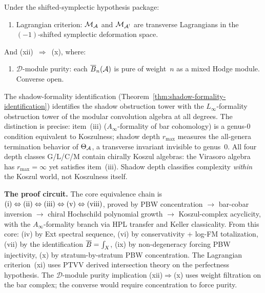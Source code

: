 \noindent
Under the shifted-symplectic hypothesis package:

\begin{enumerate}[label=\textup{(\roman*)},nosep,start=11]
\item Lagrangian criterion: $\mathcal{M}_{\mathcal{A}}$ and $\mathcal{M}_{\mathcal{A}^!}$ are
 transverse Lagrangians in the $(-1)$-shifted symplectic
 deformation space.
\end{enumerate}

\noindent
And (xii)~$\Rightarrow$~(x), where:

\begin{enumerate}[label=\textup{(\roman*)},nosep,start=12]
\item $\mathcal{D}$-module purity: each $\overline{B}_n(\mathcal{A})$ is
 pure of weight~$n$ as a mixed Hodge module. Converse
 open.
\end{enumerate}

\noindent
The shadow-formality identification
(Theorem~\ref{thm:shadow-formality-identification})
identifies the shadow obstruction tower with the
$L_\infty$-formality obstruction tower of the modular
convolution algebra at all degrees. The distinction is precise:
item~(iii) ($A_\infty$-formality of bar cohomology) is a
genus-$0$ condition equivalent to Koszulness; shadow depth
$r_{\max}$ measures the all-genera termination behavior of
$\Theta_{\mathcal{A}}$, a transverse invariant invisible to genus~$0$.
All four depth classes G/L/C/M contain chirally Koszul
algebras: the Virasoro algebra has $r_{\max}=\infty$ yet
satisfies item~(iii). Shadow depth classifies complexity
\emph{within} the Koszul world, not Koszulness itself.

\medskip
\noindent\textbf{The proof circuit.}\enspace
The core equivalence chain is
$\textup{(i)} \Leftrightarrow \textup{(ii)}
\Leftrightarrow \textup{(iii)}
\Leftrightarrow \textup{(v)}
\Leftrightarrow \textup{(viii)}$,
proved by PBW concentration $\to$ bar-cobar inversion $\to$
chiral Hochschild polynomial growth $\to$ Koszul-complex acyclicity,
with the $A_\infty$-formality branch via HPL transfer and Keller
classicality. From this core: (iv) by Ext spectral sequence,
(vi) by conservativity + log-FM totalization,
(vii) by the identification $\overline{B} = \int_X$,
(ix) by non-degeneracy forcing PBW injectivity,
(x) by stratum-by-stratum PBW concentration.
The Lagrangian criterion~(xi) uses PTVV derived intersection
theory on the perfectness hypothesis. The $\mathcal{D}$-module
purity implication (xii)$\Rightarrow$(x) uses weight filtration
on the bar complex; the converse would require concentration to
force purity.

